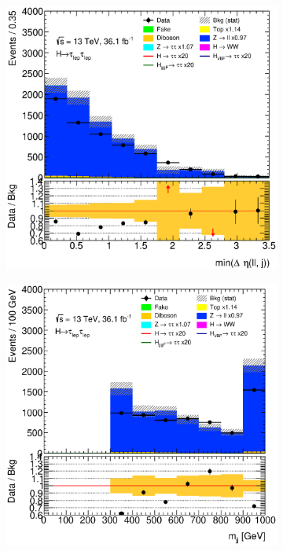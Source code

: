 \begin{figure}[htb]
\begin{subfigure}[t]{0.3\textwidth}
    \end{subfigure}
    \begin{subfigure}[t]{0.3\textwidth}
        \includegraphics[width=\textwidth]{./plots/mva/modeling/input_vars/VBF_CR/ll-CutMVAVBFCatZllCR-MinDEtaDilepJets-lin.eps}
    \end{subfigure}
    \begin{subfigure}[t]{0.3\textwidth}
        \includegraphics[width=\textwidth]{./plots/mva/modeling/input_vars/VBF_CR/ll-CutMVAVBFCatZllCR-Mjj-lin.eps}

\end{subfigure}
\end{figure}
